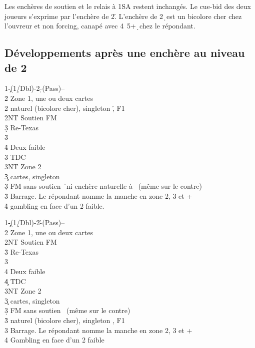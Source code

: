 \documentclass[a4paper]{article}
\begin{document}
Les enchères de soutien et le relais à 1SA restent inchangés.
Le cue-bid des deux joueurs s’exprime par l’enchère de 2\h .
L’enchère de 2\d\ est un bicolore cher chez l’ouvreur et non forcing, canapé avec 4\s\ 5+\d\ chez le 
répondant.

\subsection{Développements après une enchère au niveau de 2}

\begin{bidtable}
1\c-(1\d/Dbl)-2\d-(Pass)--\\
2\h \> Zone 1, une ou deux cartes\\
2\s \> naturel (bicolore cher), singleton \h , F1\\
2NT \> Soutien FM\+\\
3\d \> Re-Texas\+\\
3\h\+\\
4\h \> Deux faible\\
3\s \> TDC\\
3NT \> Zone 2\-\-\-\\
3\c {} cartes, singleton \h \\
3\d \> FM sans soutien \h\ ni enchère naturelle à \s\ (même sur le contre)\\
3\h \> Barrage. Le répondant nomme la manche en zone 2, 3 et +\\
4\h \> gambling en face d'un 2 faible.
\end{bidtable}

\begin{bidtable}
1\c-(1\d/Dbl)-2\h-(Pass)--\\
2\s \> Zone 1, une ou deux cartes\\
2NT \> Soutien FM\+\\
3\h \> Re-Texas\+\\
3\s\+\\
4\s \> Deux faible\\
4\c \> TDC\\
3NT \> Zone 2\-\-\-\\
3\c {} cartes, singleton \s \\
3\d \> FM sans soutien \s\ (même sur le contre)\\
3\h \> naturel (bicolore cher), singleton \s , F1\\
3\s \> Barrage. Le répondant nomme la manche en zone 2, 3 et +\\
4\s \> Gambling en face d'un 2 faible
\end{bidtable}
\end{document}
